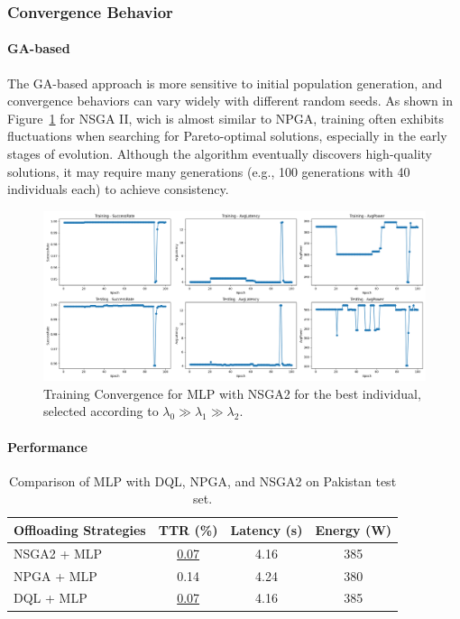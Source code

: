 \documentclass[preprint,3p,authoryear]{elsarticle}
\begin{document}
\subsubsection{Convergence Behavior}
\paragraph{GA-based}
The GA-based approach is more sensitive to initial population generation, and convergence behaviors can vary widely with different random seeds. As shown in Figure~\ref{fig:nsga2-mlp-training-epoch} for NSGA II, wich is almost similar to NPGA, training often exhibits fluctuations when searching for Pareto-optimal solutions, especially in the early stages of evolution. Although the algorithm eventually discovers high-quality solutions, it may require many generations (e.g., 100 generations with 40 individuals each) to achieve consistency.

\begin{figure}[H]
    \centering
    \includegraphics[width=0.95\linewidth]{figs/nsga2_mlp_training_epoch.png}
    \caption{Training Convergence for MLP with NSGA2 for the best individual, selected according to \(\lambda_0 \gg \lambda_1 \gg \lambda_2\).}  
    \label{fig:nsga2-mlp-training-epoch}  
\end{figure}



\paragraph{Performance}

\begin{table}[htbp]
\centering


\begin{tabular}{lccc}

\textbf{Offloading Strategies} & \textbf{TTR (\%)} & \textbf{Latency (s)} & \textbf{Energy (W)} \\

\hline

NSGA2 + MLP 
 & \underline{0.07} 
 & 4.16
 & 385 \\
 
NPGA + MLP 
 & 0.14 
 & 4.24 
 & 380 \\
 
DQL + MLP 
 & \underline{0.07} 
 & 4.16 
 & 385 \\
 


\end{tabular}

\caption{Comparison of MLP with DQL, NPGA, and NSGA2 on Pakistan test set.}\label{tab:mlp_comparison}
\end{table}
\end{document}
